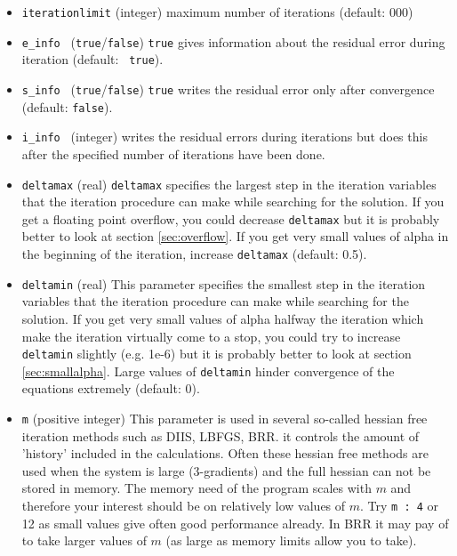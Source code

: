 \documentclass{article}
\begin{document}
\begin{itemize}
\item{\tt iterationlimit} (integer) maximum number of iterations (default: 000)

\item{\tt e\_info } ({\tt true}/{\tt false}) {\tt true} gives information about the residual error during iteration (default: {\tt 
true}).

\item{\tt s\_info } ({\tt true}/{\tt false}) {\tt true} writes the residual error only after convergence (default: {\tt false}).

\item{\tt i\_info } (integer) writes the residual errors during iterations but does this after the specified number of iterations have been done. 

\item{\tt deltamax} (real) {\tt deltamax} specifies the largest step in the iteration variables that the iteration procedure can make while searching for the solution.  If you get a floating point overflow, you could decrease {\tt deltamax} but it is probably better to look at section \ref{sec:overflow}. If you get very small values of alpha in the beginning of the iteration, increase {\tt deltamax} (default: 0.5).

\item{\tt deltamin} (real) This parameter specifies the smallest step in the iteration variables that the iteration procedure can make while searching for the solution.  If you get very small values of alpha halfway the iteration which make the iteration virtually come to a stop, you could try to increase {\tt deltamin} slightly (e.g.  1e-6) but it is probably better to look at section \ref{sec:smallalpha}. Large values of {\tt deltamin} hinder convergence of the equations extremely (default: 0).

\item{\tt m} (positive integer) This parameter is used in several so-called hessian free iteration methods such as DIIS, LBFGS, BRR. it controls the amount of 'history' included in the calculations. Often these hessian free methods are used when the system is large (3-gradients) and the full hessian can not be stored in memory. The memory need of the program scales with $m$ and therefore your interest should be on relatively low values of $m$. Try {\tt m : 4} or 12 as small values give often good performance already. In BRR it may pay of to take larger values of $m$ (as large as memory limits allow you to take).  


\end{itemize}
\end{document}
